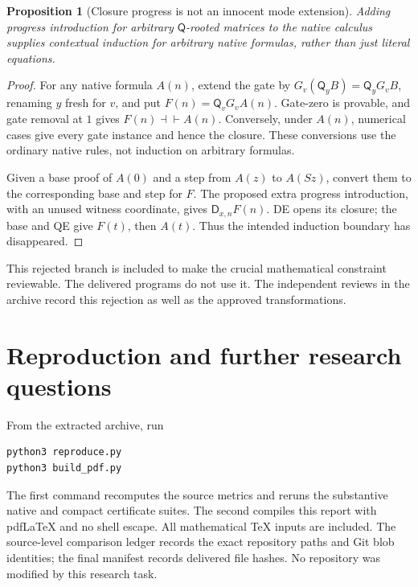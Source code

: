 \documentclass[11pt]{article}
\newtheorem{proposition}[theorem]{Proposition}
\theoremstyle{definition}\newtheorem{definition}[theorem]{Definition}
\theoremstyle{remark}\newtheorem{remark}[theorem]{Remark}
\newcommand{\D}{\mathsf D}
\newcommand{\Q}{\mathsf Q}
\begin{document}
\begin{proposition}[Closure progress is not an innocent mode extension]
Adding progress introduction for arbitrary \(\Q\)-rooted matrices to the
native calculus supplies contextual induction for arbitrary native
formulas, rather than just literal equations.
\end{proposition}
\begin{proof}
For any native formula \(A(n)\), extend the gate by
\(G_v(\Q_yB)=\Q_yG_vB\), renaming \(y\) fresh for \(v\), and put
\(F(n)=\Q_v G_vA(n)\). Gate-zero is provable, and gate removal at \(1\)
gives \(F(n)\dashv\vdash A(n)\). Conversely, under \(A(n)\), numerical
cases give every gate instance and hence the closure. These conversions
use the ordinary native rules, not induction on arbitrary formulas.

Given a base proof of \(A(0)\) and a step from \(A(z)\) to \(A(Sz)\),
convert them to the corresponding base and step for \(F\). The proposed
extra progress introduction, with an unused witness coordinate, gives
\(\D_{x,n}F(n)\). DE opens its closure; the base and QE give \(F(t)\),
then \(A(t)\). Thus the intended induction boundary has disappeared.
\end{proof}

This rejected branch is included to make the crucial mathematical
constraint reviewable. The delivered programs do not use it. The
independent reviews in the archive record this rejection as well as the
approved transformations.

\section{Reproduction and further research questions}
\label{main:reproduction}

From the extracted archive, run
\begin{lstlisting}[language=bash]
python3 reproduce.py
python3 build_pdf.py
\end{lstlisting}
The first command recomputes the source metrics and reruns the substantive
native and compact certificate suites. The second compiles this report
with pdfLaTeX and no shell escape. All mathematical TeX inputs are
included. The source-level comparison ledger records the exact repository
paths and Git blob identities; the final manifest records delivered file
hashes. No repository was modified by this research task.
\end{document}
